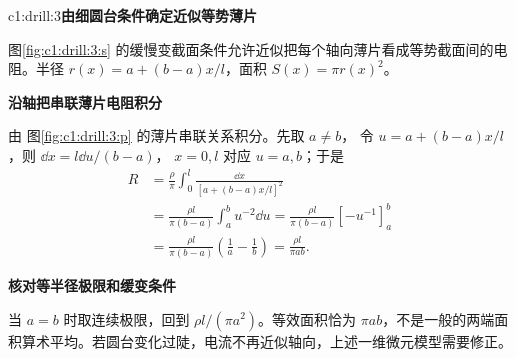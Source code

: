 \begin{drillsolution}{c1:drill:3}\textbf{由细圆台条件确定近似等势薄片}\par\nobreak
图\ref{fig:c1:drill:3:s} 的缓慢变截面条件允许近似把每个轴向薄片看成等势截面间的电阻。半径 $r(x)=a+(b-a)x/l$，面积 $S(x)=\pi r(x)^2$。



\par\medskip{}\noindent\textbf{沿轴把串联薄片电阻积分}\par\nobreak
由 图\ref{fig:c1:drill:3:p} 的薄片串联关系积分。先取 $a\ne b$，
令 $u=a+(b-a)x/l$，则 $\dd x=l\dd u/(b-a)$，
$x=0,l$ 对应 $u=a,b$；于是
\begin{align*}
 R&=\frac{\rho}{\pi}\int_0^l\frac{\dd x}{[a+(b-a)x/l]^2}\\
 &=\frac{\rho l}{\pi(b-a)}\int_a^b u^{-2}\dd u
 =\frac{\rho l}{\pi(b-a)}[-u^{-1}]_a^b\\
 &=\frac{\rho l}{\pi(b-a)}\left(\frac1a-\frac1b\right)
 =\frac{\rho l}{\pi ab}.
\end{align*}


\par\medskip{}\noindent\textbf{核对等半径极限和缓变条件}\par\nobreak
当 $a=b$ 时取连续极限，回到 $\rho l/(\pi a^2)$。等效面积恰为 $\pi ab$，不是一般的两端面积算术平均。若圆台变化过陡，电流不再近似轴向，上述一维微元模型需要修正。\end{drillsolution}
